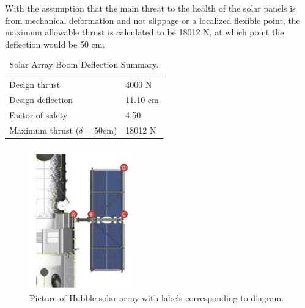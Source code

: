 \documentclass[paper=letter, fontsize=11pt]{scrartcl} %
\numberwithin{equation}{section} %
\numberwithin{figure}{section} %
\numberwithin{table}{section} %
\begin{document}
With the assumption that the main threat to the health of the solar panels is from mechanical deformation and not slippage or a localized flexible point, the maximum allowable thrust is calculated to be 18012 N, at which point the deflection would be 50 cm.

\begin{table}[H]
    \centering
    \begin{tabular}{l l}
        \toprule
        Design thrust                  & 4000 N   \\
        Design deflection              & 11.10 cm \\
        Factor of safety               & 4.50     \\
        Maximum thrust ($\delta=50$cm) & 18012 N  \\
        \bottomrule
    \end{tabular}
    \caption{Solar Array Boom Deflection Summary.}
    \label{table:solar_deflection}
\end{table}

\begin{figure}[H]
    \begin{center}
        \includegraphics[width=0.4\textwidth]{Pics/12.png}
        \caption{Picture of Hubble solar array with labels corresponding to diagram.}
        \label{fig:p12}
    \end{center}
\end{figure}
\end{document}
